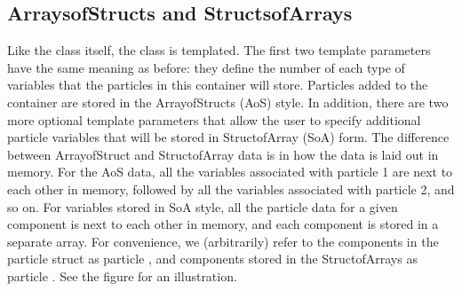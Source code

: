 \documentclass[letterpaper,10pt,english]{sphinxmanual}
\begin{document}
\subsection{Arrays\sphinxhyphen{}of\sphinxhyphen{}Structs and Structs\sphinxhyphen{}of\sphinxhyphen{}Arrays}
\label{\detokenize{Particle:arrays-of-structs-and-structs-of-arrays}}
\sphinxAtStartPar
Like the  class itself, the 
class is templated. The first two template parameters have the same meaning as
before: they define the number of each type of variables that the particles in
this container will store. Particles added to the container are stored in the
Array\sphinxhyphen{}of\sphinxhyphen{}Structs (AoS) style. In addition, there are two more optional template
parameters that allow the user to specify additional particle variables that
will be stored in Struct\sphinxhyphen{}of\sphinxhyphen{}Array (SoA) form. The difference between
Array\sphinxhyphen{}of\sphinxhyphen{}Struct and Struct\sphinxhyphen{}of\sphinxhyphen{}Array data is in how the data is laid out in
memory. For the AoS data, all the variables associated with particle 1 are next
to each other in memory, followed by all the variables associated with particle
2, and so on. For variables stored in SoA style, all the particle data for a
given component is next to each other in memory, and each component is stored
in a separate array. For convenience, we (arbitrarily) refer to the components
in the particle struct as particle , and components stored in the
Struct\sphinxhyphen{}of\sphinxhyphen{}Arrays as particle . See the figure
{\hyperref[\detokenize{Particle:fig-particles-particle-arrays}]{}} for an illustration.
\end{document}
